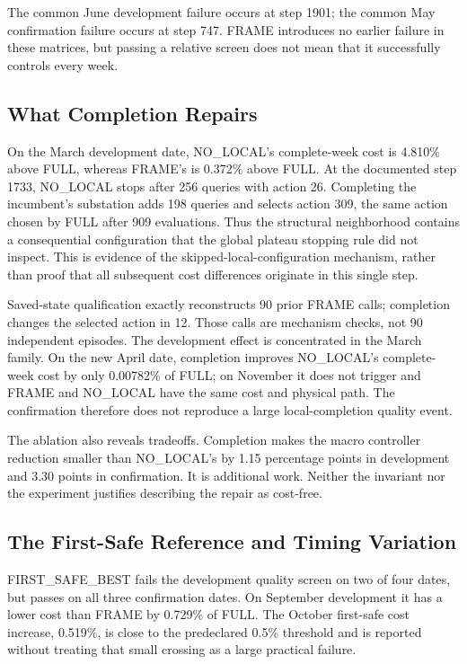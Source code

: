The common June development failure occurs at step 1901; the common May confirmation failure occurs at step 747. FRAME introduces no earlier failure in these matrices, but passing a relative screen does not mean that it successfully controls every week.


\subsection{What Completion Repairs}

On the March development date, NO\_LOCAL's complete-week cost is 4.810\% above FULL, whereas FRAME's is 0.372\% above FULL. At the documented step 1733, NO\_LOCAL stops after 256 queries with action 26. Completing the incumbent's substation adds 198 queries and selects action 309, the same action chosen by FULL after 909 evaluations. Thus the structural neighborhood contains a consequential configuration that the global plateau stopping rule did not inspect. This is evidence of the skipped-local-configuration mechanism, rather than proof that all subsequent cost differences originate in this single step.


Saved-state qualification exactly reconstructs 90 prior FRAME calls; completion changes the selected action in 12. Those calls are mechanism checks, not 90 independent episodes. The development effect is concentrated in the March family. On the new April date, completion improves NO\_LOCAL's complete-week cost by only 0.00782\% of FULL; on November it does not trigger and FRAME and NO\_LOCAL have the same cost and physical path. The confirmation therefore does not reproduce a large local-completion quality event.


The ablation also reveals tradeoffs. Completion makes the macro controller reduction smaller than NO\_LOCAL's by 1.15 percentage points in development and 3.30 points in confirmation. It is additional work. Neither the invariant nor the experiment justifies describing the repair as cost-free.


\subsection{The First-Safe Reference and Timing Variation}

FIRST\_SAFE\_BEST fails the development quality screen on two of four dates, but passes on all three confirmation dates. On September development it has a lower cost than FRAME by 0.729\% of FULL. The October first-safe cost increase, 0.519\%, is close to the predeclared 0.5\% threshold and is reported without treating that small crossing as a large practical failure.


